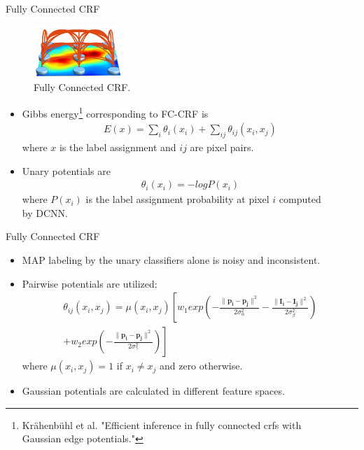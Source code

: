 \documentclass{beamer}
\begin{document}
\begin{frame}{Fully Connected CRF}
	\vspace{-0.4cm}
\begin{figure}
	\centering
	\includegraphics[width=0.3\textwidth]{figure/ss28.png}
	\captionsetup{justification=centering}
	\caption{Fully Connected CRF.}	
\end{figure}
\vspace{-0.4cm}
\begin{itemize}
	 \item Gibbs energy\footnote{Krähenbühl et al. "Efficient inference in fully connected crfs with \\ Gaussian edge potentials."} corresponding to FC-CRF is
	\begin{align*}
	E(x) =\sum_{i}\theta_i(x_i)+\sum_{ij}\theta_{ij}(x_i,x_j)
	\end{align*}
	where $x$ is the label assignment and $ij$ are pixel pairs. 
	\item<2-> Unary potentials are 
	\vspace{-0.4cm}
	\begin{align*}
	\theta_i(x_i)=-logP(x_i)
	\end{align*}
	where $P(x_i)$ is the label assignment probability at pixel $i$ computed \\by DCNN. 
\end{itemize}
\end{frame}

\begin{frame}{Fully Connected CRF}
\begin{itemize}
	\item MAP labeling by the unary classifiers alone is noisy and inconsistent. 
	\item<2-> Pairwise potentials are utilized:
	\begin{align*}	
	\theta_{ij}(x_i,x_j)=\mu(x_i,x_j)\left[ w_1exp\left(-\frac{\lVert \mathbf{p_i-p_j} \rVert^2}{2\sigma_\alpha^2}-\frac{\lVert  \mathbf{I_i-I_j} \rVert^2}{2\sigma_\beta^2} \right) \right. \\ 
	\left. + w_2exp\left(-\frac{\lVert \mathbf{p_i-p_j} \rVert^2}{2\sigma_\gamma^2}\right)   \right] 
	\end{align*}
	where $\mu(x_i,x_j)=1$ if $x_i \neq x_j$ and zero otherwise. 
	\item<3-> Gaussian potentials are calculated in different feature spaces.
\end{itemize}
\end{frame}
\end{document}
